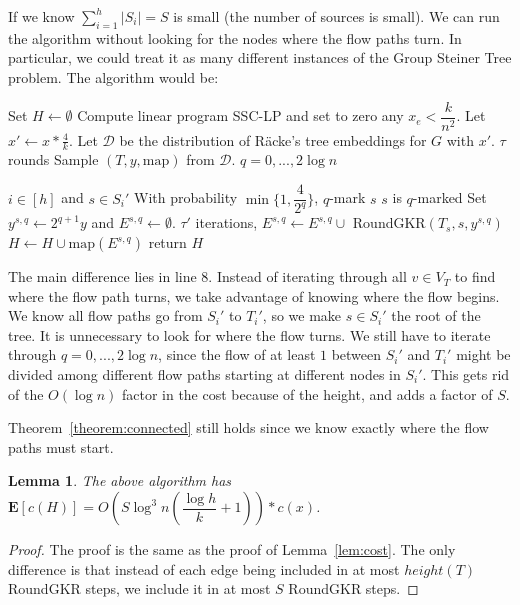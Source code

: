 \documentclass[12pt]{article}
\newtheorem{lemma}{Lemma}
\begin{document}
If we know $\sum_{i=1}^h |S_i| = S$ is small (the number of sources is small). We can run the algorithm without looking for the nodes where the flow paths turn. In particular, we could treat it as many different instances of the Group Steiner Tree problem. The algorithm would be:
\begin{codebox}
\li Set $H \leftarrow \emptyset$
\li Compute linear program SSC-LP and set to zero any $x_e < \dfrac{k}{n^2}$.
\li Let $x' \leftarrow x*\frac{4}{k}$. 
\li Let $\mathcal{D}$ be the distribution of R\"{a}cke's tree embeddings for $G$ with $x'$.
\li \For $\tau$ rounds \Do
\li Sample $(T, y, \text{map})$ from $\mathcal{D}$. 
\li \For $q = 0, ..., 2\log n$ \Do
\end{codebox}
\begin{codebox*}
\li \For \For $i \in [h]$ and $s \in S_i'$ \Do
\li With probability $\min\{1, \dfrac{4}{2^q}\}$, $q$-mark $s$
\li \If $s$ is $q$-marked \Then
\li Set $y^{s, q}\leftarrow 2^{q+1}y$ and $E^{s,q} \leftarrow \emptyset$.
\li \For $\tau'$ iterations, \Do
\li $E^{s,q} \leftarrow E^{s,q} \cup$ RoundGKR$(T_s, s, y^{s,q})$ \End
\li $H \leftarrow H \cup \text{map}(E^{s,q})$ \End \End \End \End
\li return $H$
\end{codebox*}
The main difference lies in line 8. Instead of iterating through all $v \in V_T$ to find where the flow path turns, we take advantage of knowing where the flow begins. We know all flow paths go from $S_i'$ to $T_i'$, so we make $s \in S_i'$ the root of the tree. It is unnecessary to look for where the flow turns. We still have to iterate through $q= 0, ..., 2\log n$, since the flow of at least $1$ between $S_i'$ and $T_i'$ might be divided among different flow paths starting at different nodes in $S_i'$. This gets rid of the $O(\log n)$ factor in the cost because of the height, and adds a factor of $S$.

Theorem~\ref{theorem:connected} still holds since we know exactly where the flow paths must start.

\begin{lemma}
The above algorithm has $\textbf{E}[c(H)] = O(S\log^3 n(\dfrac{\log h}{k} + 1))*c(x)$.
\end{lemma}

\begin{proof}
The proof is the same as the proof of Lemma~\ref{lem:cost}. The only difference is that instead of each edge being included in at most $height(T)$ RoundGKR steps, we include it in at most $S$ RoundGKR steps. 
\end{proof}
\end{document}
